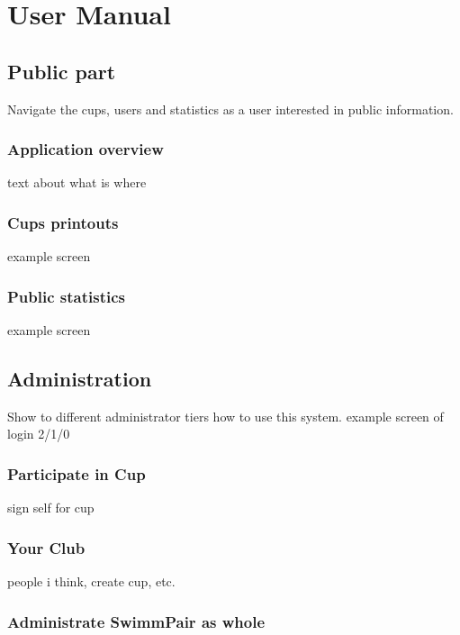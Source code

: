 \chapter{User Manual}
\section{Public part}
Navigate the cups, users and statistics as a user interested in public information.
\subsection*{Application overview}
text about what is where
\subsection*{Cups printouts}
example screen
\subsection*{Public statistics}
example screen

\section{Administration}
Show to different administrator tiers how to use this system.
example screen of login 2/1/0
\subsection*{Participate in Cup}
sign self for cup
\subsection*{Your Club}
people i think, create cup, etc.
\subsection*{Administrate SwimmPair as whole}